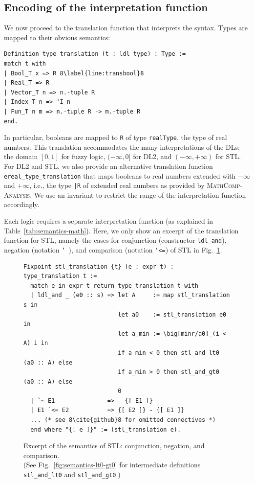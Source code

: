 \documentclass[a4paper,UKenglish,cleveref, autoref, thm-restate]{lipics-v2021}
\def\coqin#1{\texttt{#1}}
\def\DLtwo{\textrm{DL2}}
\def\STL{\textrm{STL}}
\def\analysis{\textsc{MathComp-Analysis}}
\begin{document}
\subsection{Encoding of the interpretation function}

We now proceed to the translation function that
interprets the syntax.
Types are mapped to their obvious semantics:
\begin{verbatim}
Definition type_translation (t : ldl_type) : Type :=
match t with
| Bool_T x => R 8\label{line:transbool}8
| Real_T => R
| Vector_T n => n.-tuple R
| Index_T n => 'I_n
| Fun_T n m => n.-tuple R -> m.-tuple R
end.
\end{verbatim}
In particular, booleans are mapped to \coqin{R} of type \coqin{realType}, the type of real numbers.
This translation accommodates the many interpretations of the DLs: the domain
$[0,1]$ for fuzzy logic, $(-\infty, 0]$ for \DLtwo{}, and $(-\infty, +\infty)$ for \STL{}.
%
For \DLtwo{} and \STL{}, we also provide an alternative translation function \coqin{ereal_type_translation}
that maps booleans to real numbers extended with $-\infty$ and $+\infty$, i.e., the type \coqin{\bar R} of extended real numbers
as provided by \analysis.
%
We use an invariant to restrict the range of the interpretation function accordingly.

Each logic requires a separate interpretation function (as explained
in Table~\ref{tab:semantics-math}).  Here, we only show an excerpt of
the translation function for \STL{}, namely the cases for conjunction
(constructor \coqin{ldl_and}), negation (notation \coqin{`~}), and comparison
(notation \coqin{`<=}) of \STL{} in Fig.~\ref{fig:semantics-coq}.

\begin{figure}[h]
\begin{verbatim}
Fixpoint stl_translation {t} (e : expr t) : type_translation t :=
  match e in expr t return type_translation t with
  | ldl_and _ (e0 :: s) => let A     := map stl_translation s in       
                           let a0    := stl_translation e0 in          
                           let a_min := \big[minr/a0]_(i <- A) i in    
                           if a_min < 0 then stl_and_lt0 (a0 :: A) else
                           if a_min > 0 then stl_and_gt0 (a0 :: A) else
                           0                                           
  | `~ E1               => - {[ E1 ]}
  | E1 `<= E2           => {[ E2 ]} - {[ E1 ]}
  ... (* see 8\cite{github}8 for omitted connectives *)
  end where "{[ e ]}" := (stl_translation e).
\end{verbatim}
\setlength{\belowcaptionskip}{-5pt}
\caption{Excerpt of the semantics of \STL{}: conjunction, negation, and comparison. \\
{\footnotesize (See Fig.~\ref{fig:semantics-lt0-gt0} for intermediate definitions \coqin{stl_and_lt0} and \coqin{stl_and_gt0}.)}}
\label{fig:semantics-coq}
\end{figure}
\end{document}
